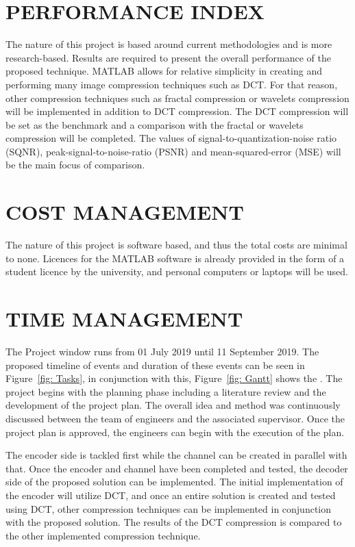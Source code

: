 \documentclass[10pt,twocolumn, a4paper]{witseiepaper}
\begin{document}
%
\section{PERFORMANCE INDEX}
\label{sec: Performance Index}
The nature of this project is based around current methodologies and is more research-based. Results are required to present the overall performance of the proposed technique. MATLAB allows for relative simplicity in creating and performing many image compression techniques such as DCT. For that reason, other compression techniques such as fractal compression or wavelets compression will be implemented in addition to DCT compression. The DCT compression will be set as the benchmark and a comparison with the fractal or wavelets compression will be completed. The values of signal-to-quantization-noise ratio (SQNR), peak-signal-to-noise-ratio (PSNR) and mean-squared-error (MSE) will be the main focus of comparison.

%
\section{COST MANAGEMENT}
\label{sec: Cost Management}
The nature of this project is software based, and thus the total costs are minimal to none. Licences for the MATLAB software is already provided in the form of a student licence by the university, and personal computers or laptops will be used.

%
\section{TIME MANAGEMENT}
\label{sec: Time Management}
The Project window runs from 01 July 2019 until 11 September 2019. The proposed timeline of events and duration of these events can be seen in Figure~\ref{fig: Tasks}, in conjunction with this, Figure~\ref{fig: Gantt} shows the . The project begins with the planning phase including a literature review and the development of the project plan. The overall idea and method was continuously discussed between the team of engineers and the associated supervisor. Once the project plan is approved, the engineers can begin with the execution of the plan.

The encoder side is tackled first while the channel can be created in parallel with that. Once the encoder and channel have been completed and tested, the decoder side of the proposed solution can be implemented. The initial implementation of the encoder will utilize DCT, and once an entire solution is created and tested using DCT, other compression techniques can be implemented in conjunction with the proposed solution. The results of the DCT compression is compared to the other implemented compression technique.
\end{document}
